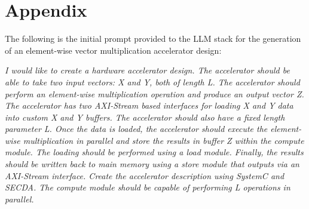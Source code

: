 \documentclass[sigplan,screen]{acmart}
\begin{document}







\appendix

\section*{Appendix}


The following is the initial prompt provided to the LLM stack for the generation of an element-wise vector multiplication accelerator design:

\emph{
I would like to create a hardware accelerator design.  
The accelerator should be able to take two input vectors: X and Y, both of length L.  
The accelerator should perform an element-wise multiplication operation and produce an output vector Z.  
The accelerator has two AXI-Stream based interfaces for loading X and Y data into custom X and Y buffers.  
The accelerator should also have a fixed length parameter L.  
Once the data is loaded, the accelerator should execute the element-wise multiplication in parallel and store the results in buffer Z within the compute module.  
The loading should be performed using a load module.  
Finally, the results should be written back to main memory using a store module that outputs via an AXI-Stream interface.  
Create the accelerator description using SystemC and SECDA.  
The compute module should be capable of performing L operations in parallel.
}
\end{document}
